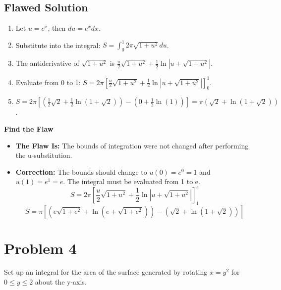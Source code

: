 \documentclass{article}
\begin{document}
\subsection{Flawed Solution}
\begin{enumerate}
    \item Let \(u=e^x\), then \(du=e^x dx\).
    \item Substitute into the integral: \(S = \int_0^1 2\pi \sqrt{1+u^2} du\).
    \item The antiderivative of \(\sqrt{1+u^2}\) is \(\frac{u}{2}\sqrt{1+u^2} + \frac{1}{2}\ln|u+\sqrt{1+u^2}|\).
    \item Evaluate from 0 to 1: \(S = 2\pi \left[\frac{u}{2}\sqrt{1+u^2} + \frac{1}{2}\ln|u+\sqrt{1+u^2}|\right]_0^1\).
    \item \(S = 2\pi \left[ (\frac{1}{2}\sqrt{2} + \frac{1}{2}\ln(1+\sqrt{2})) - (0 + \frac{1}{2}\ln(1)) \right] = \pi(\sqrt{2} + \ln(1+\sqrt{2}))\).
\end{enumerate}
\textbf{Find the Flaw}
\begin{itemize}
    \item \textbf{The Flaw Is:} The bounds of integration were not changed after performing the u-substitution.
    \item \textbf{Correction:} The bounds should change to \(u(0)=e^0=1\) and \(u(1)=e^1=e\). The integral must be evaluated from 1 to e.
    \[ S = 2\pi \left[\frac{u}{2}\sqrt{1+u^2} + \frac{1}{2}\ln|u+\sqrt{1+u^2}|\right]_1^e \]
    \[ S = \pi \left[ (e\sqrt{1+e^2} + \ln(e+\sqrt{1+e^2})) - (\sqrt{2} + \ln(1+\sqrt{2})) \right] \]
\end{itemize}

\section{Problem 4}
Set up an integral for the area of the surface generated by rotating \(x=y^2\) for \(0 \le y \le 2\) about the y-axis.
\end{document}
